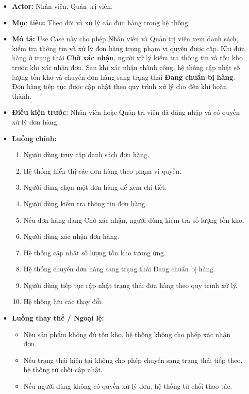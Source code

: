 \documentclass[12pt,a4paper]{article}
\begin{document}
\begin{itemize}

    \item \textbf{Actor:} Nhân viên, Quản trị viên.

    \item \textbf{Mục tiêu:} Theo dõi và xử lý các đơn hàng trong hệ thống.

    \item \textbf{Mô tả:} Use Case này cho phép Nhân viên và Quản trị viên xem danh sách, kiểm tra thông tin và xử lý đơn hàng trong phạm vi quyền được cấp. Khi đơn hàng ở trạng thái \textbf{Chờ xác nhận}, người xử lý kiểm tra thông tin và tồn kho trước khi xác nhận đơn. Sau khi xác nhận thành công, hệ thống cập nhật số lượng tồn kho và chuyển đơn hàng sang trạng thái \textbf{Đang chuẩn bị hàng}. Đơn hàng tiếp tục được cập nhật theo quy trình xử lý cho đến khi hoàn thành.

    \item \textbf{Điều kiện trước:} Nhân viên hoặc Quản trị viên đã đăng nhập và có quyền xử lý đơn hàng.

    \item \textbf{Luồng chính:}
    \begin{enumerate}
        \item Người dùng truy cập danh sách đơn hàng.
        \item Hệ thống hiển thị các đơn hàng theo phạm vi quyền.
        \item Người dùng chọn một đơn hàng để xem chi tiết.
        \item Người dùng kiểm tra thông tin đơn hàng.
        \item Nếu đơn hàng đang Chờ xác nhận, người dùng kiểm tra số lượng tồn kho.
        \item Người dùng xác nhận đơn hàng.
        \item Hệ thống cập nhật số lượng tồn kho tương ứng.
        \item Hệ thống chuyển đơn hàng sang trạng thái Đang chuẩn bị hàng.
        \item Người dùng tiếp tục cập nhật trạng thái đơn hàng theo quy trình xử lý.
        \item Hệ thống lưu các thay đổi.
    \end{enumerate}

    \item \textbf{Luồng thay thế / Ngoại lệ:}
    \begin{itemize}
        \item Nếu sản phẩm không đủ tồn kho, hệ thống không cho phép xác nhận đơn.
        \item Nếu trạng thái hiện tại không cho phép chuyển sang trạng thái tiếp theo, hệ thống từ chối cập nhật.
        \item Nếu người dùng không có quyền xử lý đơn, hệ thống từ chối thao tác.
    \end{itemize}


\end{itemize}
\end{document}
